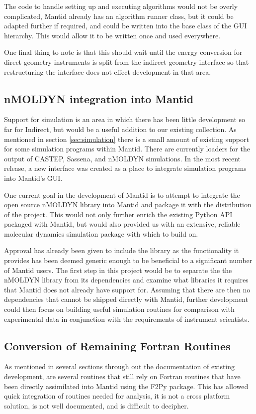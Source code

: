 \documentclass[paper=a4, fontsize=11pt]{scrartcl}	%
\numberwithin{equation}{section}															%
\numberwithin{figure}{section}																%
\numberwithin{table}{section}																%
\begin{document}
The code to handle setting up and executing algorithms would not be overly complicated, Mantid already has an algorithm runner class, but it could be adapted further if required, and could be written into the base class of the GUI hierarchy. This would allow it to be written once and used everywhere. 

One final thing to note is that this should wait until the energy conversion for direct geometry instruments is split from the indirect geometry interface so that restructuring the interface does not effect development in that area.

\subsection{nMOLDYN integration into Mantid}
Support for simulation is an area in which there has been little development so far for Indirect, but would be a useful addition to our existing collection. As mentioned in section \ref{sec:simulation} there is a small amount of existing support for some simulation programs within Mantid. There are currently loaders for the output of CASTEP, Sassena, and nMOLDYN simulations. In the most recent release, a new interface was created as a place to integrate simulation programs into Mantid's GUI.

One current goal in the development of Mantid is to attempt to integrate the open source nMOLDYN library into Mantid and package it with the distribution of the project. This would not only further enrich the existing Python API packaged with Mantid, but would also provided us with an extensive, reliable molecular dynamics simulation package with which to build on.

Approval has already been given to include the library as the functionality it provides has been deemed generic enough to be beneficial to a significant number of Mantid users. The first step in this project would be to separate the the nMOLDYN library from its dependencies and examine what libraries it requires that Mantid does not already have support for. Assuming that there are then no dependencies that cannot be shipped directly with Mantid, further development could then focus on building useful simulation routines for comparison with experimental data in conjunction with the requirements of instrument scientists.

\subsection{Conversion of Remaining Fortran Routines}
\label{subsec:convert-fortran}
As mentioned in several sections through out the documentation of existing development, are several routines that still rely on Fortran routines that have been directly assimilated into Mantid using the F2Py package. This has allowed quick integration of routines needed for analysis, it is not a cross platform solution, is not well documented, and is difficult to decipher.
\end{document}
